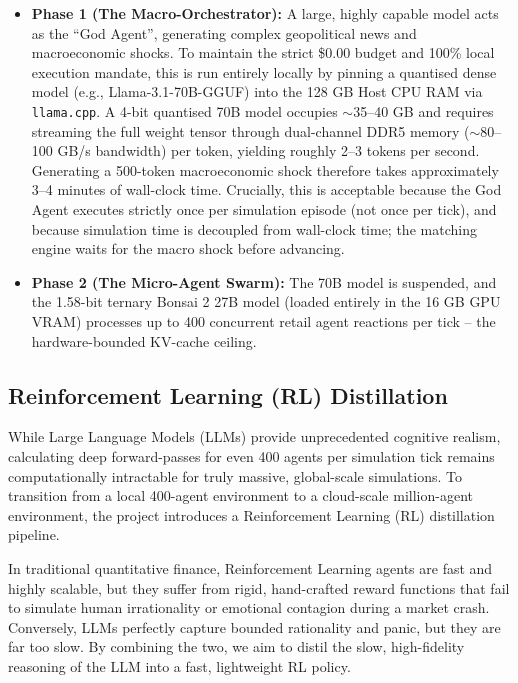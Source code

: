 \documentclass[10pt,a4paper]{article}
\begin{document}
\begin{itemize}
    \item \textbf{Phase 1 (The Macro-Orchestrator):} A large, highly capable model acts as the ``God Agent'', generating complex geopolitical news and macroeconomic shocks. To maintain the strict \$0.00 budget and 100\% local execution mandate, this is run entirely locally by pinning a quantised dense model (e.g., Llama-3.1-70B-GGUF) into the 128 GB Host CPU RAM via \texttt{llama.cpp}. A 4-bit quantised 70B model occupies $\sim$35--40 GB and requires streaming the full weight tensor through dual-channel DDR5 memory ($\sim$80--100 GB/s bandwidth) per token, yielding roughly 2--3 tokens per second. Generating a 500-token macroeconomic shock therefore takes approximately 3--4 minutes of wall-clock time. Crucially, this is acceptable because the God Agent executes strictly once per simulation episode (not once per tick), and because simulation time is decoupled from wall-clock time; the matching engine waits for the macro shock before advancing.
    \item \textbf{Phase 2 (The Micro-Agent Swarm):} The 70B model is suspended, and the 1.58-bit ternary Bonsai 2 27B model (loaded entirely in the 16 GB GPU VRAM) processes up to 400 concurrent retail agent reactions per tick -- the hardware-bounded KV-cache ceiling.
\end{itemize}

\subsection{Reinforcement Learning (RL) Distillation}

While Large Language Models (LLMs) provide unprecedented cognitive realism, calculating deep forward-passes for even 400 agents per simulation tick remains computationally intractable for truly massive, global-scale simulations. To transition from a local 400-agent environment to a cloud-scale million-agent environment, the project introduces a Reinforcement Learning (RL) distillation pipeline.

In traditional quantitative finance, Reinforcement Learning agents are fast and highly scalable, but they suffer from rigid, hand-crafted reward functions that fail to simulate human irrationality or emotional contagion during a market crash. Conversely, LLMs perfectly capture bounded rationality and panic, but they are far too slow. By combining the two, we aim to distil the slow, high-fidelity reasoning of the LLM into a fast, lightweight RL policy.
\end{document}
